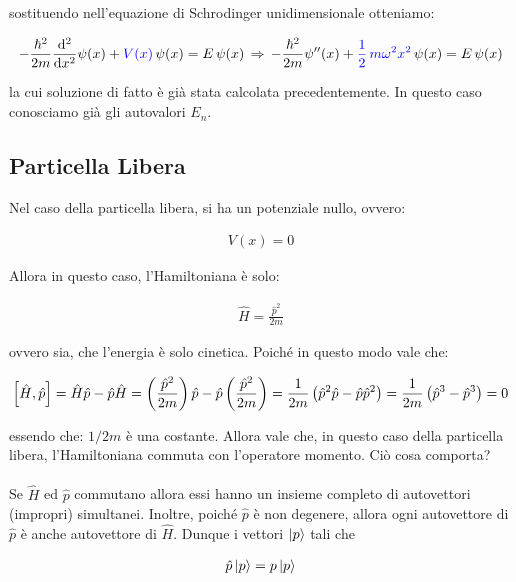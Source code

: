 	sostituendo nell'equazione di Schrodinger unidimensionale otteniamo:
	
\begin{align*}
	-\frac{\hbar^2}{2m} \dv[2]{x} \psi(x) + \textcolor{blue}{V(x)} \, \psi(x) = E \, \psi(x) \, \Rightarrow \, -\frac{\hbar^2}{2m}\psi''(x)  +\textcolor{blue}{\frac{1}{2} \, m\omega^2 x^2} \, \psi(x) =  E \, \psi(x)
\end{align*}

	la cui soluzione di fatto è già stata calcolata precedentemente. In questo caso conosciamo già gli autovalori $E_n$.

\subsection{Particella Libera}

	Nel caso della particella libera, si ha un potenziale nullo, ovvero:
	
\begin{align*}
	V(x) = 0
\end{align*}

	Allora in questo caso, l'Hamiltoniana è solo:

\begin{align*}
	\hat{H} = \frac{\hat{p}^2}{2m}
\end{align*}

	ovvero sia, che l'energia è solo cinetica. Poiché in questo modo vale che:
	
\begin{align*}
	\qty[\hat{H}, \hat{p}] = \hat{H}\hat{p} - \hat{p}\hat{H} = \qty(\frac{\hat{p}^2}{2m}) \, \hat{p} - \hat{p} \, \qty( \frac{\hat{p}^2}{2m} )  = \frac{1}{2m} \, \qty(\hat{p}^2\hat{p} - \hat{p}\hat{p}^2) = \frac{1}{2m} \, \qty(\hat{p}^3 - \hat{p}^3) = 0
\end{align*} 

	essendo che: $1/2m$ è una costante. Allora vale che, in questo caso della particella libera, l'Hamiltoniana commuta con l'operatore momento. Ciò cosa comporta?
	\\
	\\
	Se $\hat{H}$ ed $\hat{p}$ commutano allora essi hanno un insieme completo di autovettori (impropri) simultanei. Inoltre, poiché $\hat{p}$ è non degenere, allora ogni autovettore di $\hat{p}$ è anche autovettore di $\hat{H}$. Dunque i vettori $\ket{p}$ tali che
	
\begin{align*}
	\hat{p} \ket{p} = p \ket{p}
\end{align*}

